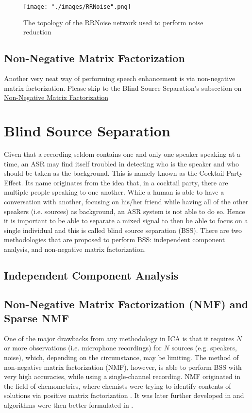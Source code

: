 \begin{figure}[H]
\begin{center}
    \texttt{[image: "./images/RRNoise".png]}
    \caption{The topology of the RRNoise network used to perform noise reduction}
    \label{fig::RRNoisearch}
\end{center}
\end{figure}

\subsection{Non-Negative Matrix Factorization}
Another very neat way of performing speech enhancement is via non-negative matrix factorization. Please skip to the Blind Source Separation's subsection on \hyperref[sec:NMF]{Non-Negative Matrix Factorization} \cite{spectralclustering}

\section{Blind Source Separation}
Given that a recording seldom contains one and only one speaker speaking at a time, an ASR may find itself troubled in detecting who is the speaker and who should be taken as the background. This is namely known as the Cocktail Party Effect. Its name originates from the idea that, in a cocktail party, there are multiple people speaking to one another. While a human is able to have a conversation with another, focusing on his/her friend while having all of the other speakers (i.e. sources) as background, an ASR system is not able to do so. Hence it is important to be able to separate a mixed signal to then be able to focus on a single individual and this is called blind source separation (BSS). There are two methodologies that are proposed to perform BSS: independent component analysis, and non-negative matrix factorization.


\subsection{Independent Component Analysis}
\subsection{Non-Negative Matrix Factorization (NMF) and Sparse NMF} \label{sec:NMF}
One of the major drawbacks from any methodology in ICA is that it requires $N$ or more observations (i.e. microphone recordings) for $N$ sources (e.g. speakers, noise), which, depending on the circumstance, may be limiting. The method of non-negative matrix factorization (NMF), however, is able to perform BSS with very high accuracies, while using a single-channel recording. NMF originated in the field of chemometrics, where chemists were trying to identify contents of solutions via positive matrix factorization \cite{pmf} \cite{pmf_chem}. It was later further developed in \cite{nmf1} and algorithms were then better formulated in \cite{nmf2}.

